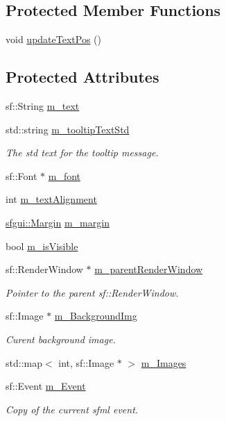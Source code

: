 \subsection*{Protected Member Functions}
\begin{CompactItemize}
\item 
void \hyperlink{classsfgui_1_1Object_27d9eb8b653f263f76b612cd77512321}{updateTextPos} ()
\end{CompactItemize}
\subsection*{Protected Attributes}
\begin{CompactItemize}
\item 
sf::String \hyperlink{classsfgui_1_1Object_b63c033215c2f6f1d64645e3c6f0153b}{m\_\-text}
\item 
std::string \hyperlink{classsfgui_1_1Object_d54c76d28fac3a92b8b97f1758a75685}{m\_\-tooltipTextStd}
\begin{CompactList}\small\item\em The std text for the tooltip message. \item\end{CompactList}\item 
sf::Font $\ast$ \hyperlink{classsfgui_1_1Object_20ec4624e3d9b8e3cebeb71ec97fd104}{m\_\-font}
\item 
int \hyperlink{classsfgui_1_1Object_7cfb56995f2140319df705fb1b146d36}{m\_\-textAlignment}
\item 
\hyperlink{structsfgui_1_1Margin}{sfgui::Margin} \hyperlink{classsfgui_1_1Object_b7afeee103f0cfc0c045effa8527a4b4}{m\_\-margin}
\item 
bool \hyperlink{classsfgui_1_1Object_105c5d17fb896da439156e5c198e5bb2}{m\_\-isVisible}
\item 
sf::RenderWindow $\ast$ \hyperlink{classsfgui_1_1Object_518ad23f1c9aab6fd9b346d708c503a8}{m\_\-parentRenderWindow}
\begin{CompactList}\small\item\em Pointer to the parent sf::RenderWindow. \item\end{CompactList}\item 
sf::Image $\ast$ \hyperlink{classsfgui_1_1Object_08225eee55352c02435d14e1bce24dbe}{m\_\-BackgroundImg}
\begin{CompactList}\small\item\em Curent background image. \item\end{CompactList}\item 
std::map$<$ int, sf::Image $\ast$ $>$ \hyperlink{classsfgui_1_1Object_6d7907f767742dcfd37c1b0c349daa2d}{m\_\-Images}
\item 
sf::Event \hyperlink{classsfgui_1_1Object_bd45c91f926c930806870ce8acbb955e}{m\_\-Event}
\begin{CompactList}\small\item\em Copy of the current sfml event. \item\end{CompactList}\end{CompactItemize}
